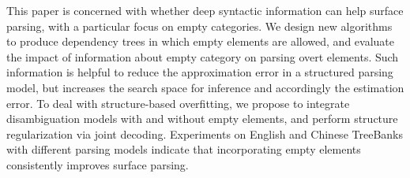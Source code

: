 This paper is concerned with whether deep syntactic information can help surface parsing, with a particular focus on empty categories. We design new algorithms to produce dependency trees in which empty elements are allowed, and evaluate the impact of information about empty category on parsing overt elements. Such information is helpful to reduce the approximation error in a structured parsing model, but increases the search space for inference and accordingly the estimation error. To deal with structure-based overfitting, we propose to integrate disambiguation models with and without empty elements, and perform structure regularization via joint decoding. Experiments on English and Chinese TreeBanks with different parsing models indicate that incorporating empty elements consistently improves surface parsing.
